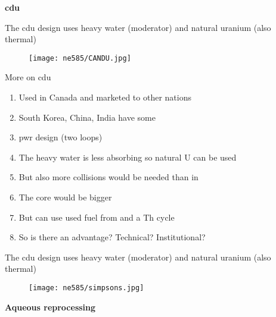 \documentclass[aspectratio=1610,pdftex,dvipsnames,compress,xcolor={dvipsnames}]{beamer}
\newcommand{\acs}{\acrshort} %
\newcommand{\acsp}{\acrshortpl} %
\begin{document}
\begin{frame}[plain]{}
    \centering\LARGE\textbf{\acs{cdu}}
\end{frame}


\addtocounter{framenumber}{-1} 
\begin{frame}{The \acs{cdu} design uses heavy water (moderator) and natural uranium (also thermal)}
    \begin{figure}
        \centering
        \texttt{[image: ne585/CANDU.jpg]}
    \end{figure}
\end{frame}


\begin{frame}{More on \acs{cdu}}
    \begin{enumerate}[series=outerlist,topsep=0pt,itemsep=18pt,leftmargin=*,label=(\arabic*)]
        \item[]Used in Canada and marketed to other nations
        \item[]South Korea, China, India have some
        \item[]\acs{pwr} design (two loops)
        \item[]The heavy water is less absorbing so natural U can be used
        \item[]But also more collisions would be needed than in \acsp{lwr}
        \item[]The core would be bigger
        \item[]But can use used fuel from \acsp{lwr} and a Th cycle
        \item[]So is there an advantage?  Technical?  Institutional?
    \end{enumerate}
\end{frame}


\begin{frame}{The \acs{cdu} design uses heavy water (moderator) and natural uranium (also thermal)}
    \begin{figure}
        \centering
        \texttt{[image: ne585/simpsons.jpg]}
    \end{figure}
\end{frame}


\begin{frame}[plain]{}
    \centering\LARGE\textbf{Aqueous reprocessing}
\end{frame}
\end{document}

